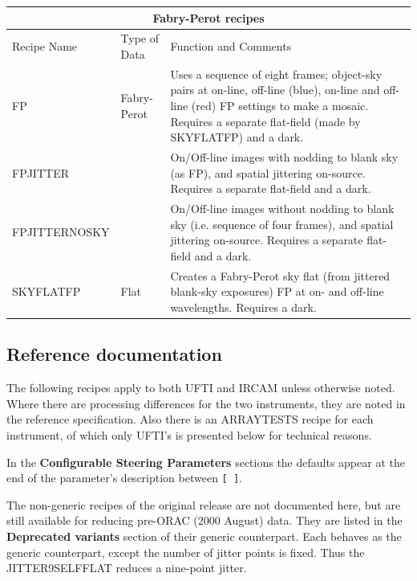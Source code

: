 \documentclass[twoside,11pt]{article}
\newcommand{\htmlref}[2]{#1}
\renewcommand{\_}{\texttt{\symbol{95}}}
\begin{document}
\begin{center}
\begin{tabular}{|l|p{25mm}|p{81mm}|}
\multicolumn{3}{c}{\large{\bf Fabry-Perot recipes}} \vspace*{1ex} \\
\hline
Recipe Name & Type of Data & Function and Comments \\ \hline
\htmlref{FP}{FP} & Fabry-Perot &
   Uses a sequence of eight frames; object-sky pairs at on-line,
   off-line (blue), on-line and off-line (red) FP settings to make
   a mosaic.  Requires a separate flat-field (made by SKY\_FLAT\_FP)
   and a dark. \\ \hline
\htmlref{FP\_JITTER}{FP\_JITTER} & &
   On/Off-line images with nodding to blank sky (as FP), and spatial
   jittering on-source.  Requires a separate flat-field and a dark. \\ \hline
\htmlref{FP\_JITTER\_NO\_SKY}{FP\_JITTER\_NO\_SKY} & &
   On/Off-line images without nodding to blank sky (i.e. sequence of
   four frames), and spatial jittering on-source. 
   Requires a separate flat-field and a dark.  \\ \hline
\htmlref{SKY\_FLAT\_FP}{SKY\_FLAT\_FP} & Flat &
   Creates a Fabry-Perot sky flat (from jittered blank-sky exposures) 
   FP at on- and off-line wavelengths.  Requires a dark. \\ \hline
\end{tabular}
\end{center}
\bigskip

\newpage
\subsection{Reference documentation}

The following recipes apply to both UFTI and IRCAM unless otherwise
noted.  Where there are processing differences for the two instruments,
they are noted in the reference specification.  Also there is an
ARRAY\_TESTS recipe for each instrument, of which only UFTI's is
presented below for technical reasons.

In the {\bf Configurable Steering Parameters} sections the defaults
appear at the end of the parameter's description between {\tt [~]}.

The non-generic recipes of the original release are not documented
here, but are still available for reducing pre-ORAC (2000 August)
data.  They are listed in the {\bf Deprecated variants} section of
their generic counterpart.  Each behaves as the generic counterpart,
except the number of jitter points is fixed.  Thus the
JITTER9\_SELF\_FLAT reduces a nine-point jitter.
\bigskip\bigskip\bigskip
\end{document}
